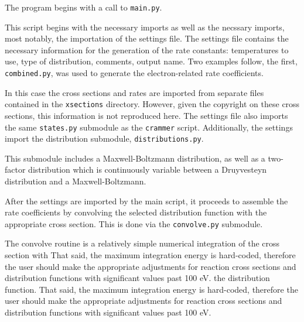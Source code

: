 {
}

The program begins with a call to \texttt{main.py}.
\begin{singlespace}
  
\end{singlespace}
This script begins with the necessary imports as well as the necssary imports,
most notably, the importation of the settings file. The settings file contains
the necessary information for the generation of the rate constants: temperatures
to use, type of distribution, comments, output name. Two examples follow, the
first, \texttt{combined.py}, was used to generate the electron-related rate
coefficients.
\begin{singlespace}
  
\end{singlespace}
In this case the cross sections and rates are imported from separate files
contained in the \texttt{xsections} directory. However, given the copyright on
these cross sections, this information is not reproduced here. The settings file
also imports the same \texttt{states.py} submodule as the \texttt{crammer}
script. Additionally, the settings import the distribution submodule,
\texttt{distributions.py}.
\begin{singlespace}
  
\end{singlespace}
This submodule includes a Maxwell-Boltzmann distribution, as well as a
two-factor distribution which is continuously variable between a Druyvesteyn
distribution and a Maxwell-Boltzmann.

After the settings are imported by the main script, it proceeds to assemble the
rate coefficients by convolving the selected distribution function with the
appropriate cross section. This is done via the \texttt{convolve.py} submodule.
\begin{singlespace}
  
\end{singlespace}
The convolve routine is a relatively simple numerical integration of the cross
section with That said, the maximum integration energy is hard-coded, therefore
the user should make the appropriate adjustments for reaction cross sections
and distribution functions with significant values past 100 eV. the distribution function. That said, the maximum integration
energy is hard-coded, therefore the user should make the appropriate adjustments
for reaction cross sections and distribution functions with significant values
past 100 eV.
